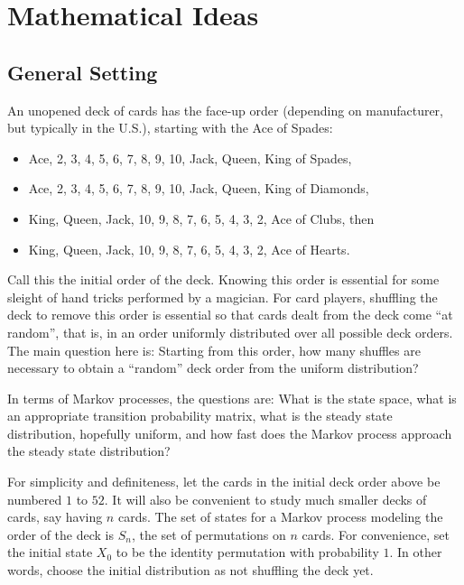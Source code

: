 \documentclass[12pt]{article}
\begin{document}
\hr

\section*{Mathematical Ideas}

\subsection*{General Setting}

An unopened deck of cards has the face-up order (depending on manufacturer,
but typically in the U.S.), 
starting with the Ace of Spades:
\begin{itemize}
\item Ace, 2, 3, 4, 5, 6, 7, 8, 9, 10, Jack, Queen, King of Spades,
\item Ace, 2, 3, 4, 5, 6, 7, 8, 9, 10, Jack, Queen, King of Diamonds,
\item King, Queen, Jack, 10, 9, 8, 7, 6, 5, 4, 3, 2, Ace of Clubs,
  then
\item King, Queen, Jack, 10, 9, 8, 7, 6, 5, 4, 3, 2, Ace of Hearts.
\end{itemize}
Call this the initial order of the deck.  Knowing this order is
essential for some sleight of hand tricks performed by a
magician.  For card players, shuffling the deck to remove this order
is essential so that cards dealt from the deck come ``at random'',
that is, in an order uniformly distributed over all possible deck orders.
The main question here is: Starting from this order, how many shuffles are
necessary to obtain a ``random'' deck order from the uniform distribution?

In terms of Markov processes, the questions are: What is the state
space, what is an appropriate transition probability matrix, what is
the  steady state distribution, hopefully uniform, and how fast does
the Markov process approach the steady state distribution?

For simplicity and definiteness, let the cards in the initial deck order above be
numbered \( 1 \) to \( 52 \).  It will also be convenient to study much
smaller decks of cards, say having \( n \) cards.  The set of states for a Markov process
modeling the order of the deck is \( S_n \), the set of permutations on \( n \)
cards.  For convenience, set the initial state \( X_0
\) to be the identity permutation with probability \( 1 \).  In other
words, choose the initial distribution as not shuffling the deck yet.
\end{document}
